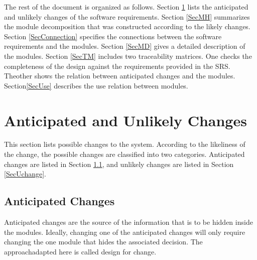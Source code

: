 \documentclass[12pt, titlepage]{article}
\begin{document}
The rest of the document is organized as follows. Section
\ref{SecChange} lists the anticipated and unlikely changes of the software
requirements. Section \ref{SecMH} summarizes the module decomposition that
was constructed according to the likely changes. Section \ref{SecConnection}
specifies the connections between the software requirements and the
modules. Section \ref{SecMD} gives a detailed description of the
modules. Section \ref{SecTM} includes two traceability matrices. One checks
the completeness of the design against the requirements provided in the SRS.
Theother shows the relation between anticipated changes and the modules.
Section\ref{SecUse} describes the use relation between modules.

\section{Anticipated and Unlikely Changes} \label{SecChange}

This section lists possible changes to the system. According to the likeliness
of the change, the possible changes are classified into two
categories. Anticipated changes are listed in Section \ref{SecAchange}, and
unlikely changes are listed in Section \ref{SecUchange}.

\subsection{Anticipated Changes} \label{SecAchange}

Anticipated changes are the source of the information that is to be hidden
inside the modules. Ideally, changing one of the anticipated changes will only
require changing the one module that hides the associated decision. The
approachadapted here is called design for
change.
\end{document}
